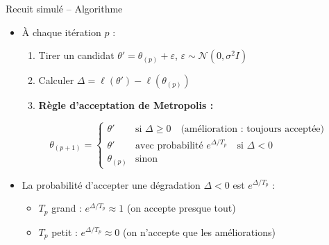 \documentclass[11pt,aspectratio=169]{beamer}
\begin{document}
\begin{frame}{Recuit simulé -- Algorithme}

\begin{itemize}

\item À chaque itération $p$ :

  \begin{enumerate}
    \item Tirer un candidat $\theta' = \theta_{(p)} + \varepsilon$, \quad $\varepsilon \sim \mathcal{N}(0, \sigma^2 I)$\newline
    \item Calculer $\Delta = \ell(\theta') - \ell(\theta_{(p)})$\newline
    \item \textbf{Règle d'acceptation de Metropolis :}
  \end{enumerate}

  \[
  \boxed{\theta_{(p+1)} = \begin{cases}
      \theta' & \text{si } \Delta \geq 0 \quad \text{(amélioration : toujours acceptée)} \\
      \theta' & \text{avec probabilité } e^{\Delta / T_p} \quad \text{si } \Delta < 0 \\
      \theta_{(p)} & \text{sinon}
  \end{cases}}
  \]

\item La probabilité d'accepter une dégradation $\Delta < 0$ est $e^{\Delta/T_p}$ :
  \begin{itemize}
    \item $T_p$ grand : $e^{\Delta/T_p} \approx 1$ (on accepte presque tout)\newline
    \item $T_p$ petit : $e^{\Delta/T_p} \approx 0$ (on n'accepte que les améliorations)
  \end{itemize}

\end{itemize}

\end{frame}
\end{document}
